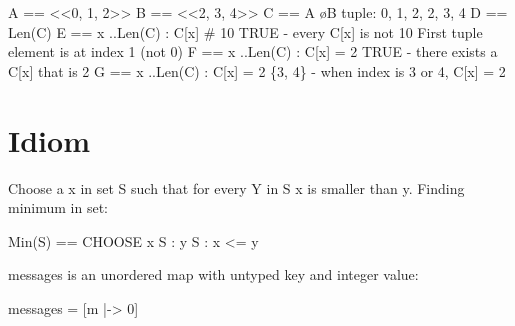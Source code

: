 \documentclass{report}
\begin{document}
\begin{tla}
A == <<0, 1, 2>>                    
B == <<2, 3, 4>>
C == A \o B                         \* tuple: 0, 1, 2, 2, 3, 4
D == Len(C)                         
E == \A x ..Len(C) : C[x] # 10 \* TRUE - every C[x] is not 10
                                    \* First tuple element is at index 1 (not 0)
F == \E x ..Len(C) : C[x] = 2  \* TRUE - there exists a C[x] that is 2
G == {x ..Len(C) : C[x] = 2}   \* \{3, 4\} - when index is 3 or 4, C[x] = 2
\end{tla}
\begin{tlatex}
%
%
%
%
\@xx{}%
%
%
\@xx{}%
%
\@xx{}%
%
%
\@xx{}%
%
\@xx{}%
%
\@xx{}%
\end{tlatex}

\chapter{Idiom}

Choose a x in set S such that for every Y in S x is smaller than y.
Finding minimum in set:\newline
\begin{tla}
    Min(S) == CHOOSE x \in S : \A y \in S : x <= y
\end{tla}
\begin{tlatex}
\end{tlatex}
\newline

messages is an unordered map with untyped key and integer value:\newline

\begin{tla}
messages = [m \in {} |-> 0]
\end{tla}
\begin{tlatex}
%
\end{tlatex}
\end{document}
